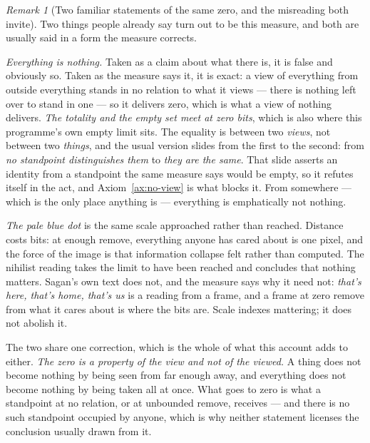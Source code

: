 \documentclass[11pt,a4paper]{article}
\theoremstyle{remark}\newtheorem{remark}[definition]{Remark}
\begin{document}
\begin{remark}[Two familiar statements of the same zero, and the misreading both invite]\label{rem:everything-nothing}
Two things people already say turn out to be this measure, and both are usually said in a form the
measure corrects.

\emph{Everything is nothing.} Taken as a claim about what there is, it is false and obviously so. Taken
as the measure says it, it is exact: a view of everything from outside everything stands in no relation
to what it views --- there is nothing left over to stand in one --- so it delivers zero, which is what
a view of nothing delivers. \emph{The totality and the empty set meet at zero bits}, which is also
where this programme's own empty limit sits. The equality is between two \emph{views}, not between two
\emph{things}, and the usual version slides from the first to the second: from \emph{no standpoint
distinguishes them} to \emph{they are the same}. That slide asserts an identity from a standpoint the
same measure says would be empty, so it refutes itself in the act, and Axiom~\ref{ax:no-view} is what blocks it.
From somewhere --- which is the only place anything is --- everything is emphatically not nothing.

\emph{The pale blue dot} \citep{sagan1994} is the same scale approached rather than reached. Distance
costs bits: at enough remove, everything anyone has cared about is one pixel, and the force of the
image is that information collapse felt rather than computed. The nihilist reading takes the limit to
have been reached and concludes that nothing matters. Sagan's own text does not, and the measure says
why it need not: \emph{that's here, that's home, that's us} is a reading from a frame, and a frame at
zero remove from what it cares about is where the bits are. Scale indexes mattering; it does not
abolish it.

The two share one correction, which is the whole of what this account adds to either. \emph{The zero is
a property of the view and not of the viewed.} A thing does not become nothing by being seen from far
enough away, and everything does not become nothing by being taken all at once. What goes to zero is
what a standpoint at no relation, or at unbounded remove, receives --- and there is no such standpoint
occupied by anyone, which is why neither statement licenses the conclusion usually drawn from it.
\end{remark}
\end{document}
